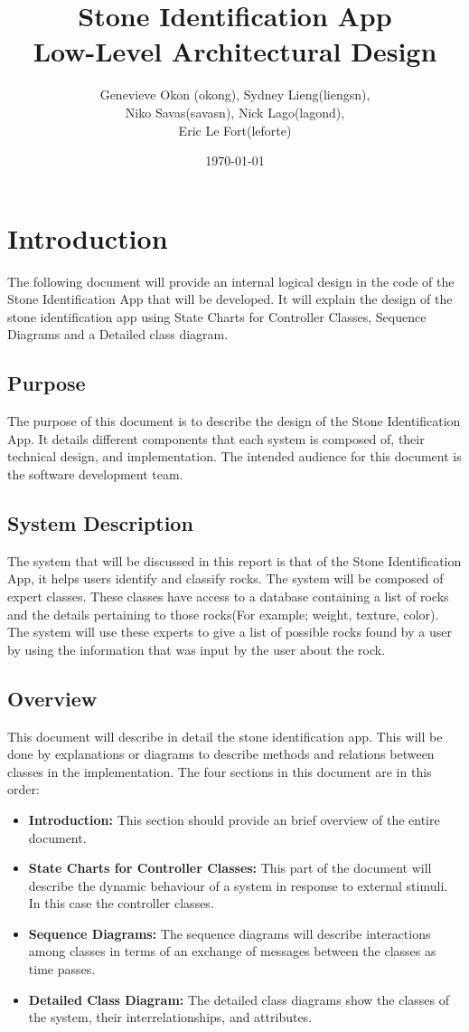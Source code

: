 \documentclass[titlepage]{article}
\title{Stone Identification App \\
	Low-Level Architectural Design}
\author{Genevieve Okon (okong), Sydney Lieng(liengsn),\\
	Niko Savas(savasn), Nick Lago(lagond),\\
	Eric Le Fort(leforte)}
\date{\today}
\begin{document}
\maketitle
\newpage
\tableofcontents
\newpage


\section{Introduction}

The following document will provide an internal logical design in the code of the Stone Identification App that will be developed.  It will explain the design of the stone identification app using State Charts for Controller Classes, Sequence Diagrams and a Detailed class diagram.

\subsection{Purpose}
The purpose of this document is to describe the design of the Stone Identification App. It details different components that each system is composed of, their technical design, and implementation. The intended audience for this document is the software development team.

\subsection{System Description}
The system that will be discussed in this report is that of the Stone Identification App, it helps users identify and classify rocks. The system will be composed of expert classes. These classes have access to a database containing a list of rocks and the details pertaining to those rocks(For example; weight, texture, color). The system will use these experts to give a list of possible rocks found by a user by using the information that was input by the user about the rock. 

\subsection{Overview}
This document will describe in detail the stone identification app. This will be done by explanations or diagrams to describe methods and relations between classes in the implementation. The four sections in this document are in this order: 
\begin{itemize}
\item \textbf{Introduction:} This section should provide an brief overview of the entire document. 
\item \textbf{State Charts for Controller Classes:} This part of the document will describe the dynamic behaviour of a system in response to external stimuli. In this case the controller classes. 
\item \textbf{Sequence Diagrams:} The sequence diagrams will describe interactions among classes in terms of an exchange of messages between the classes as time passes. 
\item \textbf{Detailed Class Diagram:} The detailed class diagrams show the classes of the system, their interrelationships, and attributes.  


\end{itemize}
\end{document}
